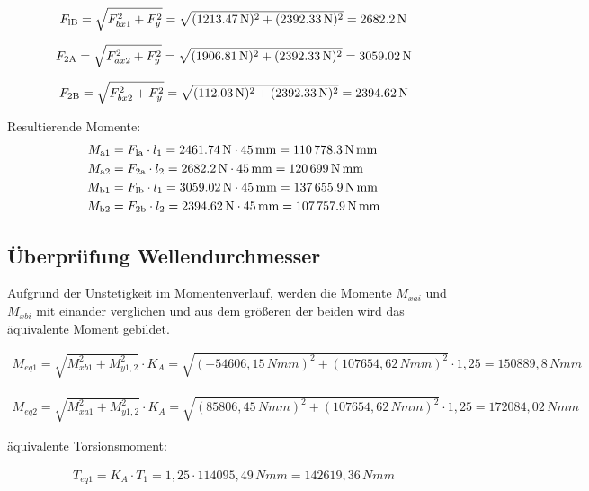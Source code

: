 \documentclass[15pt,a4paper]{article}
\begin{document}
     $$F_{\rm lB}= \sqrt{F_{bx1}^2+F_y^2}= \sqrt{(\SI{1213,47}{\newton})^2+ (\SI{2392,33}{\newton})^2}= \SI{2682,2}{\newton}$$
     
     $$F_{\rm 2A}= \sqrt{F_{ax2}^2+F_y^2}= \sqrt{(\SI{1906,81}{\newton})^2 + (\SI{2392,33}{\newton})^2} = \SI{3059,02}{\newton}$$
     
     $$F_{\rm 2B}= \sqrt{F_{bx2}^2+F_y^2}= \sqrt{(\SI{112,03}{\newton})^2 + (\SI{2392,33}{\newton})^2} = \SI{2394,62}{\newton} $$
     
     
     Resultierende Momente:
     \begin{align*}
     	M_{\rm a1} &= F_{\rm la} \cdot l_1  = \SI{2461,74}{\newton}\cdot \SI{45}{\milli\m} = \SI{110778,3}{\newton\milli\m}\\
     	M_{\rm a2} &= F_{\rm 2a} \cdot l_2  = \SI{2682,2}{\newton}\cdot \SI{45}{\milli\m} = \SI{120699}{\newton\milli\m}\\
     	M_{\rm b1} &= F_{\rm lb} \cdot l_1  = \SI{3059,02}{\newton}\cdot \SI{45}{\milli\m} = \SI{137655,9}{\newton\milli\m}\\
     	M_{\rm b2} &= F_{\rm 2b} \cdot l_2  = \SI{2394,62}{\newton}\cdot \SI{45}{\milli\m} = \SI{107757,9}{\newton\milli\m}
     \end{align*}
     
     \subsection{Überprüfung Wellendurchmesser}
     Aufgrund der Unstetigkeit im Momentenverlauf, werden die Momente $M_{xai}$ und$M_{xbi}$ mit einander verglichen und aus dem größeren der beiden wird das äquivalente Moment gebildet. 
     
     \begin{align*}
     	M_{eq1}=\sqrt{M_{xb1}^{2}+M_{y1,2}^{2}} \cdot K_{A}=\sqrt{(-54606,15\,Nmm)^{2} + (107654,62\,Nmm)^{2}} \cdot 1,25=150889,8\,Nmm
     \end{align*}
     
     \begin{align*}
     	M_{eq2}=\sqrt{M_{xa1}^{2}+M_{y1,2}^{2}} \cdot K_{A} =\sqrt{(85806,45\,Nmm)^{2}+(107654,62\,Nmm)^{2}}\cdot 1,25=172084,02\,Nmm
     \end{align*}	
     
     äquivalente Torsionsmoment:
     
     \begin{align*}
     	T_{eq1}=K_{A} \cdot T_{1}=1,25 \cdot 114095,49\,Nmm=142619,36 \,Nmm
     \end{align*}
     
\end{document}
